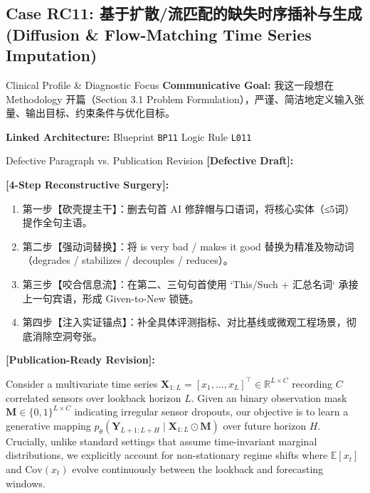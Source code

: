 \subsection{Case RC11: 基于扩散/流匹配的缺失时序插补与生成 (Diffusion \& Flow-Matching Time Series Imputation)}\label{case:RC11}
\begin{ConceptBox}{Clinical Profile \& Diagnostic Focus}
\textbf{Communicative Goal:} 我这一段想在 Methodology 开篇（Section 3.1 Problem Formulation），严谨、简洁地定义输入张量、输出目标、约束条件与优化目标。\par
\textbf{Linked Architecture:} Blueprint \texttt{BP11} \enspace\textbar\enspace Logic Rule \texttt{L011}
\end{ConceptBox}
\begin{ExampleBox}{Defective Paragraph vs. Publication Revision}
\textbf{\color{TargetHighlight}[Defective Draft]:}\par
{}\par\vspace{6pt}
\textbf{\color{AcadForest}[4-Step Reconstructive Surgery]:}
\begin{enumerate}[label=\textbf{\color{AcadNavy}Step \arabic*:}, leftmargin=2em]
  \item 第一步【砍壳提主干】：删去句首 AI 修辞帽与口语词，将核心实体（≤5词）提作全句主语。
  \item 第二步【强动词替换】：将 is very bad / makes it good 替换为精准及物动词（degrades / stabilizes / decouples / reduces）。
  \item 第三步【咬合信息流】：在第二、三句句首使用 `This/Such + 汇总名词` 承接上一句宾语，形成 Given-to-New 锁链。
  \item 第四步【注入实证锚点】：补全具体评测指标、对比基线或微观工程场景，彻底消除空洞夸张。
\end{enumerate}\vspace{4pt}
\textbf{\color{AcadNavy}[Publication-Ready Revision]:}\par
Consider a multivariate time series $\mathbf{X}_{1:L} = [x_1, \dots, x_L]^\top \in \mathbb{R}^{L \times C}$ recording $C$ correlated sensors over lookback horizon $L$. Given an binary observation mask $\mathbf{M} \in \{0, 1\}^{L \times C}$ indicating irregular sensor dropouts, our objective is to learn a generative mapping $p_\theta(\mathbf{Y}_{L+1:L+H} \mid \mathbf{X}_{1:L} \odot \mathbf{M})$ over future horizon $H$. Crucially, unlike standard settings that assume time-invariant marginal distributions, we explicitly account for non-stationary regime shifts where $\mathbb{E}[x_t]$ and $\text{Cov}(x_t)$ evolve continuously between the lookback and forecasting windows.
\end{ExampleBox}
